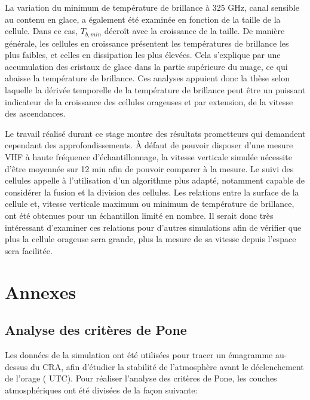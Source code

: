 \documentclass[12pt]{article}
\begin{document}
\begin{multicols}{2}
La variation du minimum de température de brillance à 325 GHz, canal sensible au contenu en glace, a également été examinée en fonction de la taille de la cellule. Dans ce cas, $T_{b, min}$ décroît avec la croissance de la taille. De manière générale, les cellules en croissance présentent les températures de brillance les plus faibles, et celles en dissipation les plus élevées. Cela s’explique par une accumulation des cristaux de glace dans la partie supérieure du nuage, ce qui abaisse la température de brillance. Ces analyses appuient donc la thèse selon laquelle la dérivée temporelle de la température de brillance peut être un puissant indicateur de la croissance des cellules orageuses et par extension, de la vitesse des ascendances. 

Le travail réalisé durant ce stage montre des résultats prometteurs qui demandent cependant des approfondissements. À défaut de pouvoir disposer d'une mesure VHF à haute fréquence d'échantillonnage, la vitesse verticale simulée nécessite d'être moyennée sur 12 min afin de pouvoir comparer à la mesure. Le suivi des cellules appelle à l'utilisation d'un algorithme plus adapté, notamment capable de considérer la fusion et la division des cellules. Les relations entre la surface de la cellule et, vitesse verticale maximum ou minimum de température de brillance, ont été obtenues pour un échantillon limité en nombre. Il serait donc très intéressant d’examiner ces relations pour d’autres simulations afin de vérifier que plus la cellule orageuse sera grande, plus la mesure de sa vitesse depuis l’espace sera facilitée.
 
\end{multicols}

\clearpage
\vspace*{-2cm}
\section{Annexes}

\subsection{Analyse des critères de Pone} \label{Pone}

Les données de la simulation ont été utilisées pour tracer un émagramme au-dessus du CRA, afin d'étudier la stabilité de l'atmosphère avant le déclenchement de l'orage ( UTC). Pour réaliser l'analyse des critères de Pone, les couches atmosphériques ont été divisées de la façon suivante: \\
\end{document}
